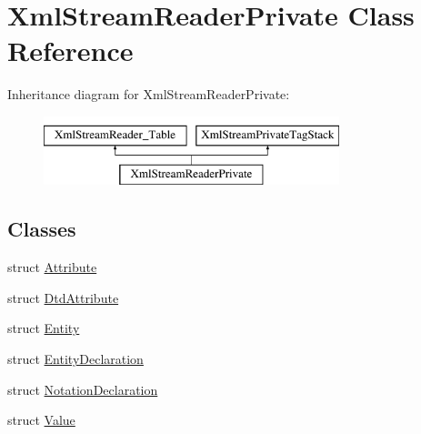 \hypertarget{class_xml_stream_reader_private}{}\section{Xml\+Stream\+Reader\+Private Class Reference}
\label{class_xml_stream_reader_private}
Inheritance diagram for Xml\+Stream\+Reader\+Private\+:\begin{figure}[H]
\begin{center}
\leavevmode
\includegraphics[height=2.000000cm]{class_xml_stream_reader_private}
\end{center}
\end{figure}
\subsection*{Classes}
\begin{DoxyCompactItemize}
\item 
struct \hyperlink{struct_xml_stream_reader_private_1_1_attribute}{Attribute}
\item 
struct \hyperlink{struct_xml_stream_reader_private_1_1_dtd_attribute}{Dtd\+Attribute}
\item 
struct \hyperlink{struct_xml_stream_reader_private_1_1_entity}{Entity}
\item 
struct \hyperlink{struct_xml_stream_reader_private_1_1_entity_declaration}{Entity\+Declaration}
\item 
struct \hyperlink{struct_xml_stream_reader_private_1_1_notation_declaration}{Notation\+Declaration}
\item 
struct \hyperlink{struct_xml_stream_reader_private_1_1_value}{Value}
\end{DoxyCompactItemize}
